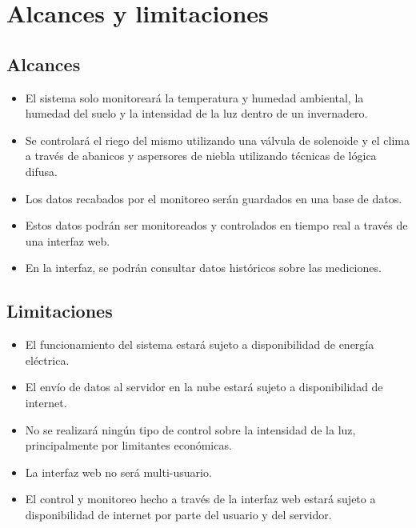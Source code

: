 \section{Alcances y limitaciones}

\subsection*{Alcances}
\begin{itemize}
    \item El sistema solo monitoreará la temperatura y humedad ambiental, la humedad del suelo y la intensidad de la luz dentro de un invernadero.
    \item Se controlará el riego del mismo utilizando una válvula de solenoide y el clima a través de abanicos y aspersores de niebla utilizando técnicas de lógica difusa. 
    \item Los datos recabados por el monitoreo serán guardados en una base de datos.
    \item Estos datos podrán ser monitoreados y controlados en tiempo real a través de una interfaz web.
    \item En la interfaz, se podrán consultar datos históricos sobre las mediciones.
\end{itemize}

\subsection*{Limitaciones}
\begin{itemize}
    \item El funcionamiento del sistema estará sujeto a disponibilidad de energía eléctrica.
    \item El envío de datos al servidor en la nube estará sujeto a disponibilidad de internet.
    \item No se realizará ningún tipo de control sobre la intensidad de la luz, principalmente por limitantes económicas.
    \item La interfaz web no será multi-usuario.
    \item El control y monitoreo hecho a través de la interfaz web estará sujeto a disponibilidad de internet por parte del usuario y del servidor.
\end{itemize}
